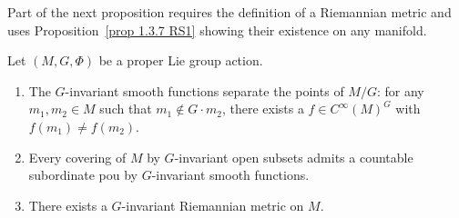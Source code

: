 Part of the next proposition requires the definition of a Riemannian metric and uses Proposition~\ref{prop 1.3.7 RS1} showing their existence on any manifold.

\begin{prop}[{{\cite[Prop.~6.3.7]{RS1}}}]\label{prop 6.3.7 RS1}
    Let $(M,G,\Phi)$ be a proper Lie group action.
    \begin{enumerate}
        \item The $G$-invariant smooth functions separate the points of $M\slash G$: for any $m_1,m_2\in M$ such that $m_1\notin G\cdot m_2$, there exists a $f\in C^\infty(M)^G$ with $f(m_1)\neq f(m_2)$.
        \item Every covering of $M$ by $G$-invariant open subsets admits a countable subordinate \gls{pou} by $G$-invariant smooth functions.
        \item There exists a $G$-invariant Riemannian metric on $M$.
    \end{enumerate}
\end{prop}
